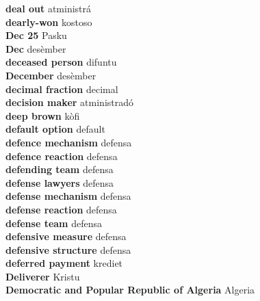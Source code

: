 \textbf{ deal out  } atministrá \\
\textbf{ dearly-won  } kostoso \\
\textbf{ Dec 25  } Pasku \\
\textbf{ Dec  } desèmber \\
\textbf{ deceased person  } difuntu \\
\textbf{ December  } desèmber \\
\textbf{ decimal fraction  } decimal \\
\textbf{ decision maker  } atministradó \\
\textbf{ deep brown  } kòfi \\
\textbf{ default option  } default \\
\textbf{ defence mechanism  } defensa \\
\textbf{ defence reaction  } defensa \\
\textbf{ defending team  } defensa \\
\textbf{ defense lawyers  } defensa \\
\textbf{ defense mechanism  } defensa \\
\textbf{ defense reaction  } defensa \\
\textbf{ defense team  } defensa \\
\textbf{ defensive measure  } defensa \\
\textbf{ defensive structure  } defensa \\
\textbf{ deferred payment  } krediet \\
\textbf{ Deliverer  } Kristu \\
\textbf{ Democratic and Popular Republic of Algeria  } Algeria \\
